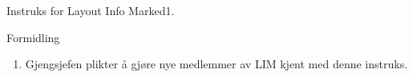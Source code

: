 \begin{instruks}{Instruks for Layout Info Marked}{1. }{ }
    \begin{instruksledd}{Formidling}
        \begin{enumerate}
            \item Gjengsjefen plikter å gjøre nye medlemmer av LIM kjent med denne instruks.
        \end{enumerate}
    \end{instruksledd}


\end{instruks}


